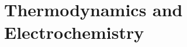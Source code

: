 \documentclass[../chem.tex]{subfiles}
\begin{document}
\chapter{Thermodynamics and Electrochemistry}
\end{document}
